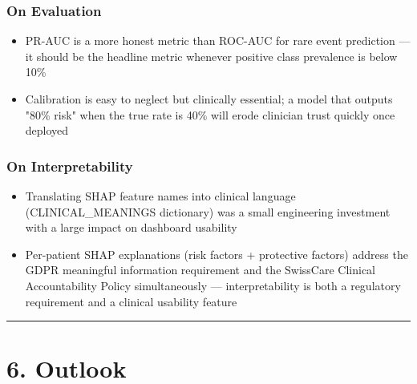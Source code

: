 \documentclass[11pt,a4paper]{article}
\begin{document}
\subsubsection{On Evaluation}
\begin{itemize}
\item PR-AUC is a more honest metric than ROC-AUC for rare event prediction --- it should be the headline metric whenever positive class prevalence is below 10\%
\item Calibration is easy to neglect but clinically essential; a model that outputs "80\% risk" when the true rate is 40\% will erode clinician trust quickly once deployed
\end{itemize}

\subsubsection{On Interpretability}
\begin{itemize}
\item Translating SHAP feature names into clinical language (CLINICAL\_MEANINGS dictionary) was a small engineering investment with a large impact on dashboard usability
\item Per-patient SHAP explanations (risk factors + protective factors) address the GDPR meaningful information requirement and the SwissCare Clinical Accountability Policy simultaneously --- interpretability is both a regulatory requirement and a clinical usability feature
\end{itemize}

\noindent\rule{\linewidth}{0.4pt}

\section{6. Outlook}
\end{document}

